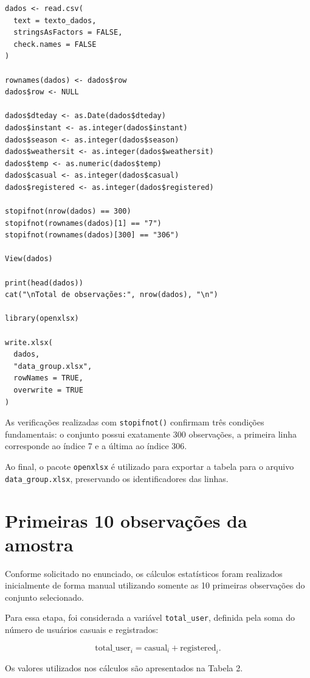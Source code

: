 \documentclass[12pt,a4paper]{article}
\begin{document}
\begin{verbatim}
dados <- read.csv(
  text = texto_dados,
  stringsAsFactors = FALSE,
  check.names = FALSE
)

rownames(dados) <- dados$row
dados$row <- NULL

dados$dteday <- as.Date(dados$dteday)
dados$instant <- as.integer(dados$instant)
dados$season <- as.integer(dados$season)
dados$weathersit <- as.integer(dados$weathersit)
dados$temp <- as.numeric(dados$temp)
dados$casual <- as.integer(dados$casual)
dados$registered <- as.integer(dados$registered)

stopifnot(nrow(dados) == 300)
stopifnot(rownames(dados)[1] == "7")
stopifnot(rownames(dados)[300] == "306")

View(dados)

print(head(dados))
cat("\nTotal de observações:", nrow(dados), "\n")

library(openxlsx)

write.xlsx(
  dados,
  "data_group.xlsx",
  rowNames = TRUE,
  overwrite = TRUE
)
\end{verbatim}

As verificações realizadas com \texttt{stopifnot()} confirmam três condições
fundamentais: o conjunto possui exatamente 300 observações, a primeira linha
corresponde ao índice 7 e a última ao índice 306.

Ao final, o pacote \texttt{openxlsx} é utilizado para exportar a tabela para o
arquivo \texttt{data\_group.xlsx}, preservando os identificadores das linhas.

\section{Primeiras 10 observações da amostra}

Conforme solicitado no enunciado, os cálculos estatísticos foram realizados
inicialmente de forma manual utilizando somente as 10 primeiras observações do
conjunto selecionado.

Para essa etapa, foi considerada a variável \texttt{total\_user}, definida pela
soma do número de usuários casuais e registrados:

\begin{equation}
\text{total\_user}_i =
\text{casual}_i + \text{registered}_i.
\end{equation}

Os valores utilizados nos cálculos são apresentados na Tabela 2.
\end{document}
